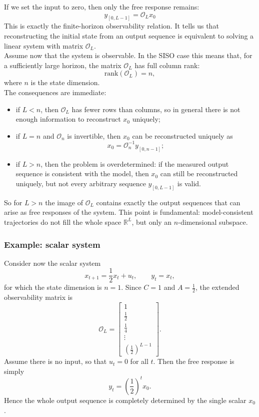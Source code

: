 If we set the input to zero, then only the free response remains:
$$
y_{[0,L-1]} = \mathcal{O}_L x_0
$$
This is exactly the finite-horizon observability relation. It tells us that reconstructing the initial state from an output sequence is equivalent to solving a linear system with matrix $\mathcal{O}_L$.\\

Assume now that the system is observable. In the SISO case this means that, for a sufficiently large horizon, the matrix $\mathcal{O}_L$ has full column rank:
\[
\text{rank}(\mathcal{O}_L)=n,
\]
where $n$ is the state dimension.\\
The consequences are immediate:
\begin{itemize}
    \item if $L<n$, then $\mathcal{O}_L$ has fewer rows than columns, so in general there is not enough information to reconstruct $x_0$ uniquely;
    \item if $L=n$ and $\mathcal{O}_n$ is invertible, then $x_0$ can be reconstructed uniquely as
    \[
    x_0 = \mathcal{O}_n^{-1} y_{[0,n-1]};
    \]
    \item if $L>n$, then the problem is overdetermined: if the measured output sequence is consistent with the model, then $x_0$ can still be reconstructed uniquely, but not every arbitrary sequence $y_{[0,L-1]}$ is valid.
\end{itemize}
So for $L>n$ the image of $\mathcal{O}_L$ contains exactly the output sequences that can arise as free responses of the system. This point is fundamental: model-consistent trajectories do not fill the whole space $\mathbb{R}^L$, but only an $n$-dimensional subspace.

\subsubsection{Example: scalar system}

Consider now the scalar system
$$
x_{t+1} = \frac{1}{2}x_t + u_t,
\qquad
y_t = x_t,
$$
for which the state dimension is $n=1$. Since $C=1$ and $A=\frac12$, the extended observability matrix is
\begin{equation*}
\mathcal{O}_L =
\begin{bmatrix}
1\\[2mm]
\frac12\\[2mm]
\frac14\\
\vdots\\
\left(\frac12\right)^{L-1}
\end{bmatrix}.
\end{equation*}
Assume there is no input, so that $u_t=0$ for all $t$. Then the free response is simply
\begin{equation*}
y_t = \left(\frac12\right)^t x_0.
\end{equation*}
Hence the whole output sequence is completely determined by the single scalar $x_0$.

